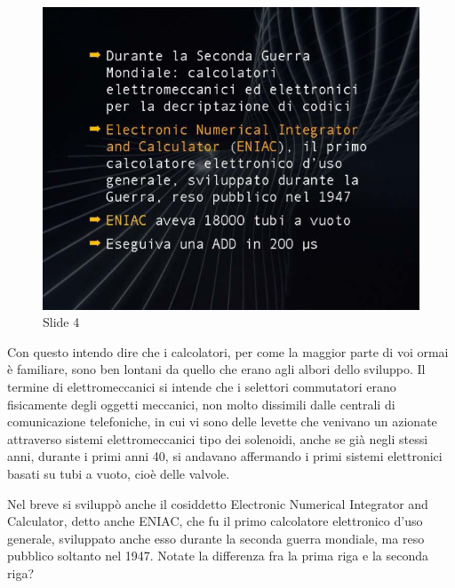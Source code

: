 \begin{figure}[ht]
    \centering
    \includegraphics[width=0.6\linewidth]{images/Lez01_P01_fig_04.png}
    \caption{Slide 4}
    \label{fig:slide_4}
\end{figure}

Con questo intendo dire che i calcolatori, per come la maggior parte di voi ormai è familiare, sono ben lontani da quello che erano agli albori dello sviluppo.
Il termine di elettromeccanici si intende che i selettori commutatori erano fisicamente degli oggetti meccanici, non molto dissimili dalle centrali di comunicazione telefoniche, in cui vi sono delle levette che venivano un azionate attraverso sistemi elettromeccanici tipo dei solenoidi, anche se già negli stessi anni, durante i primi anni 40, si andavano affermando i primi sistemi elettronici basati su tubi a vuoto, cioè delle valvole.

Nel breve si sviluppò anche il cosiddetto Electronic Numerical Integrator and Calculator, detto anche ENIAC, che fu il primo calcolatore elettronico d'uso generale, sviluppato anche esso durante la seconda guerra mondiale, ma reso pubblico soltanto nel 1947.
Notate la differenza fra la prima riga e la seconda riga?

